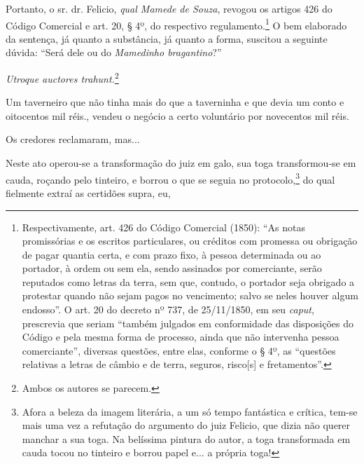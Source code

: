 {Portanto, o sr. dr. Felicio, \emph{qual Mamede de Souza}, revogou os
artigos 426 do Código Comercial e art. 20, § 4º, do respectivo
regulamento.\footnote{ Respectivamente, art. 426 do Código Comercial
  (1850): ``As notas promissórias e os escritos particulares, ou créditos
  com promessa ou obrigação de pagar quantia certa, e com prazo fixo, à
  pessoa determinada ou ao portador, à ordem ou sem ela, sendo assinados
  por comerciante, serão reputados como letras da terra, sem que,
  contudo, o portador seja obrigado a protestar quando não sejam pagos
  no vencimento; salvo se neles houver algum endosso''. O art. 20 do
  decreto nº 737, de 25/11/1850, em seu \emph{caput}, prescrevia que
  seriam ``também julgados em conformidade das dis­posições do Código e
  pela mesma forma de processo, ainda que não intervenha pessoa
  comerciante'', diversas questões, entre elas, conforme o § 4º, as
  ``questões relativas a letras de câmbio e de terra, seguros,
  risco{[}s{]} e fretamentos''.} O bem elaborado da sentença, já quanto a
substância, já quanto a forma, suscitou a seguinte dúvida: ``Será dele ou
do \emph{Mamedinho bragantino}?''

\emph{Utroque auctores trahunt.}\footnote{ Ambos os autores se parecem.}

\asterisc{}

Um taverneiro que não tinha mais do que a taverninha e que devia um
conto e oitocentos mil réis., vendeu o negócio a certo voluntário por
novecentos mil réis.

Os credores reclamaram, mas...

Neste ato operou-se a transformação do juiz em galo, sua toga
transformou-se em cauda, roçando pelo tinteiro, e borrou o que se seguia
no protocolo,\footnote{ Afora a beleza da imagem literária, a um só
  tempo fantástica e crítica, tem-se mais uma vez a refutação do
  argumento do juiz Felicio, que dizia não querer manchar a sua toga. Na
  belíssima pintura do autor, a toga transformada em cauda tocou no
  tinteiro e borrou papel e... a própria toga!} do qual fielmente extraí
as certidões supra, eu,

}
